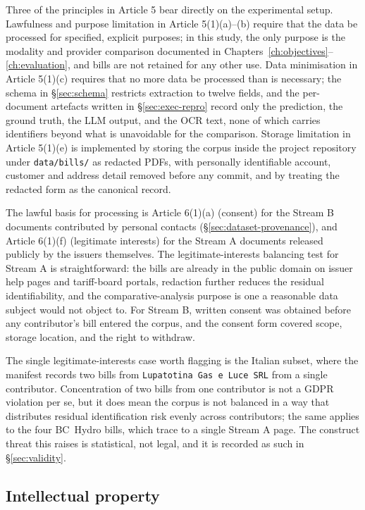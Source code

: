 Three of the principles in Article 5 bear directly on the experimental setup.
Lawfulness and purpose limitation in Article 5(1)(a)--(b) require that the data be
processed for specified, explicit purposes; in this study, the only purpose is the
modality and provider comparison documented in Chapters~\ref{ch:objectives}--\ref{ch:evaluation},
and bills are not retained for any other use. Data minimisation in Article 5(1)(c)
requires that no more data be processed than is necessary; the schema in
\S\ref{sec:schema} restricts extraction to twelve fields, and the per-document
artefacts written in \S\ref{sec:exec-repro} record only the prediction, the
ground truth, the LLM output, and the OCR text, none of which carries
identifiers beyond what is unavoidable for the comparison. Storage limitation in
Article 5(1)(e) is implemented by storing the corpus inside the project repository
under \texttt{data/bills/} as redacted PDFs, with personally identifiable account,
customer and address detail removed before any commit, and by treating the redacted
form as the canonical record.

The lawful basis for processing is Article 6(1)(a) (consent) for the Stream B
documents contributed by personal contacts (\S\ref{sec:dataset-provenance}), and
Article 6(1)(f) (legitimate interests) for the Stream A documents released
publicly by the issuers themselves. The legitimate-interests balancing test for
Stream A is straightforward: the bills are already in the public domain on
issuer help pages and tariff-board portals, redaction further reduces the residual
identifiability, and the comparative-analysis purpose is one a reasonable data
subject would not object to. For Stream B, written consent was obtained before any
contributor's bill entered the corpus, and the consent form covered scope, storage
location, and the right to withdraw.

The single legitimate-interests case worth flagging is the Italian subset, where the
manifest records two bills from \texttt{Lupatotina Gas e Luce SRL} from a single
contributor. Concentration of two bills from one contributor is not a GDPR
violation per se, but it does mean the corpus is not balanced in a way that
distributes residual identification risk evenly across contributors; the same
applies to the four BC~Hydro bills, which trace to a single Stream A page. The
construct threat this raises is statistical, not legal, and it is recorded as such
in \S\ref{sec:validity}.

\subsection{Intellectual property}

